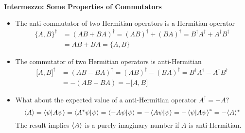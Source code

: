 \documentclass[11pt, a4paper]{article}
\begin{document}
\textbf{Intermezzo: Some Properties of Commutators}
\begin{itemize}
	\item The anti-commutator of two Hermitian operators is a Hermitian operator
	\begin{align*}
		\big\{A, B\big\}^{\dagger} &= (AB + BA)^{\dagger} = (AB)^{\dagger} + (BA)^{\dagger} = B^{\dagger}A^{\dagger} + A^{\dagger}B^{\dagger}\\
		&=AB + BA = \big\{A, B\big\}
	\end{align*}
	
	\item The commutator of two Hermitian operators is anti-Hermitian
	\begin{align*}
		\big[A, B\big]^{\dagger} &= (AB - BA)^{\dagger} = (AB)^{\dagger} - (BA)^{\dagger} = B^{\dagger}A^{\dagger} - A^{\dagger}B^{\dagger}\\
		&= - (AB - BA) = - \big[A, B\big]
	\end{align*}
	
	\item What about the expected value of a anti-Hermitian operator $ A^{\dagger} = - A $?
	\begin{equation*}
		\langle A \rangle = \braket{\psi}{A\psi} = \braket{A^{*}\psi}{\psi} = \braket{-A\psi}{\psi} = - \braket{A\psi}{\psi} = - \braket{\psi}{A\psi}^{*} = - \langle A \rangle^{*}
	\end{equation*}
	The result implies $ \expval{A} $ is a purely imaginary number if $ A $ is anti-Hermitian.
\end{itemize}
\end{document}
